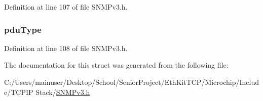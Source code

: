 Definition at line 107 of file S\+N\+M\+Pv3.\+h.

\hypertarget{structregister_context_engine_i_d_ad106adfabb3dc56cdc2d52727d9771c5}{}
\subsubsection[{pdu\+Type}]{ pdu\+Type}\label{structregister_context_engine_i_d_ad106adfabb3dc56cdc2d52727d9771c5}


Definition at line 108 of file S\+N\+M\+Pv3.\+h.



The documentation for this struct was generated from the following file\+:\begin{DoxyCompactItemize}
\item 
C\+:/\+Users/mainuser/\+Desktop/\+School/\+Senior\+Project/\+Eth\+Kit\+T\+C\+P/\+Microchip/\+Include/\+T\+C\+P\+I\+P Stack/\hyperlink{_s_n_m_pv3_8h}{S\+N\+M\+Pv3.\+h}\end{DoxyCompactItemize}
